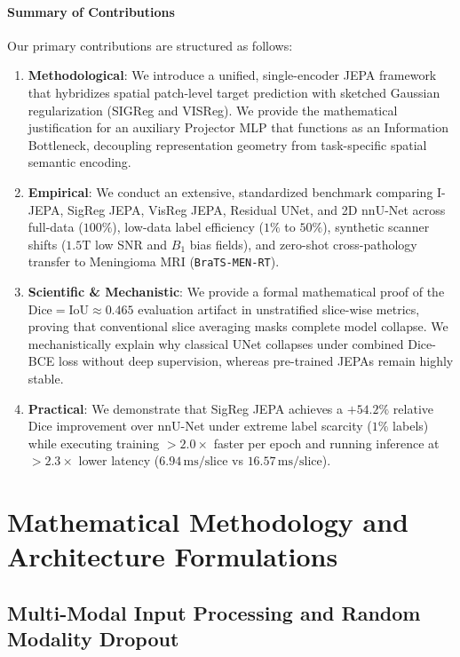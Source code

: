 \documentclass{article}
\begin{document}
\paragraph{Summary of Contributions}
Our primary contributions are structured as follows:
\begin{enumerate}
    \item \textbf{Methodological}: We introduce a unified, single-encoder JEPA framework that hybridizes spatial patch-level target prediction with sketched Gaussian regularization (SIGReg and VISReg). We provide the mathematical justification for an auxiliary Projector MLP that functions as an Information Bottleneck, decoupling representation geometry from task-specific spatial semantic encoding.
    \item \textbf{Empirical}: We conduct an extensive, standardized benchmark comparing I-JEPA, SigReg JEPA, VisReg JEPA, Residual UNet, and 2D nnU-Net across full-data ($100\%$), low-data label efficiency ($1\%$ to $50\%$), synthetic scanner shifts ($1.5\text{T}$ low SNR and $B_1$ bias fields), and zero-shot cross-pathology transfer to Meningioma MRI (\texttt{BraTS-MEN-RT}).
    \item \textbf{Scientific \& Mechanistic}: We provide a formal mathematical proof of the $\text{Dice} = \text{IoU} \approx 0.465$ evaluation artifact in unstratified slice-wise metrics, proving that conventional slice averaging masks complete model collapse. We mechanistically explain why classical UNet collapses under combined Dice-BCE loss without deep supervision, whereas pre-trained JEPAs remain highly stable.
    \item \textbf{Practical}: We demonstrate that SigReg JEPA achieves a $+54.2\%$ relative Dice improvement over nnU-Net under extreme label scarcity ($1\%$ labels) while executing training $>2.0\times$ faster per epoch and running inference at $>2.3\times$ lower latency ($6.94\,\text{ms/slice}$ vs $16.57\,\text{ms/slice}$).
\end{enumerate}


\section{Mathematical Methodology and Architecture Formulations}

\subsection{Multi-Modal Input Processing and Random Modality Dropout}
\end{document}
